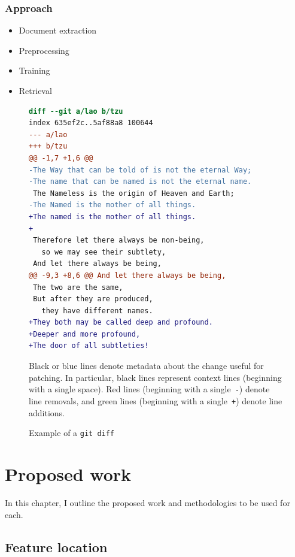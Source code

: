 \documentclass[12pt,draft]{Manuscript}
\begin{document}
\begin{body}
\subsection{Approach}\label{approach}

\begin{itemize}
\itemsep1pt\parskip0pt
\item
  Document extraction
\item
  Preprocessing
\item
  Training
\item
  Retrieval
\end{itemize}

\begin{figure}[t]
\centering
\begin{lstlisting}[language=diff, basicstyle=\ttfamily]
diff --git a/lao b/tzu
index 635ef2c..5af88a8 100644
--- a/lao
+++ b/tzu
@@ -1,7 +1,6 @@
-The Way that can be told of is not the eternal Way;
-The name that can be named is not the eternal name.
 The Nameless is the origin of Heaven and Earth;
-The Named is the mother of all things.
+The named is the mother of all things.
+
 Therefore let there always be non-being,
   so we may see their subtlety,
 And let there always be being,
@@ -9,3 +8,6 @@ And let there always be being,
 The two are the same,
 But after they are produced,
   they have different names.
+They both may be called deep and profound.
+Deeper and more profound,
+The door of all subtleties!
\end{lstlisting}
\caption{Example of a \texttt{git diff}}
Black or blue lines denote metadata about the change useful for patching.
In particular, black lines represent context lines (beginning with a single space).
Red lines (beginning with a single~\texttt{-}) denote line removals,
and green lines (beginning with a single~\texttt{+}) denote line additions.
\label{fig:diff}
\vspace{-10pt}
\end{figure}

\chapter{Proposed work}\label{proposed-work}

In this chapter, I outline the proposed work and methodologies to be
used for each.

\section{Feature location}\label{study-flt}


\end{body}
\end{document}
